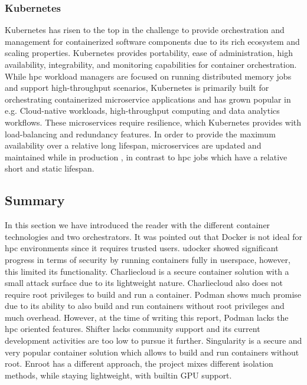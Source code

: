 \documentclass[conference]{IEEEtran}
\begin{document}
\subsubsection{Kubernetes}
Kubernetes has risen to the top in the challenge to provide orchestration and management for containerized software components due to its rich ecosystem and scaling properties. Kubernetes provides portability, ease of administration, high availability, integrability, and monitoring capabilities for container orchestration. While \gls{hpc} workload managers are focused on running distributed memory jobs and support high-throughput scenarios, Kubernetes is primarily built for orchestrating containerized microservice applications and has grown popular in e.g. Cloud-native workloads, high-throughput computing and data analytics workflows. These microservices require resilience, which Kubernetes provides with load-balancing and redundancy features. In order to provide the maximum availability over a relative long lifespan,  microservices are updated and maintained while in production \cite{hpc-kubernetes-containers}, in contrast to \gls{hpc} jobs which have a relative short and static lifespan.







\subsection{Summary}
In this section we have introduced the reader with the different container technologies and two orchestrators. It was pointed out that Docker is not ideal for \gls{hpc} environments since it requires trusted users. udocker showed significant progress in terms of security by running containers fully in userspace, however, this limited its functionality. Charliecloud is a secure container solution with a small attack surface due to its lightweight nature. Charliecloud also does not require root privileges to build and run a container. Podman shows much promise due to its ability to also build and run containers without root privileges and much overhead. However, at the time of writing this report, Podman lacks the \gls{hpc} oriented features. Shifter lacks community support and its current development activities are too low to pursue it further. Singularity is a secure and very popular container solution which allows to build and run containers without root. Enroot has a different approach, the project mixes different isolation methods, while staying lightweight, with builtin GPU support.
\end{document}
